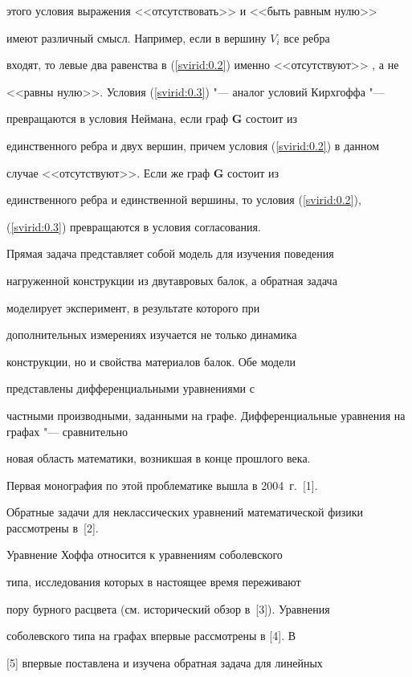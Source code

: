 этого условия вы\-ра\-же\-ния <<отсутствовать>>  и <<быть равным нулю>>

имеют различный смысл. Например, если в вершину $V_i$ все ребра

входят, то левые два равенства в (\ref{svirid:0.2}) именно <<отсутствуют>> , а не

<<равны нулю>>. Условия (\ref{svirid:0.3}) "--- аналог условий Кирхгоффа "---

превращаются в условия Неймана, если граф $\mathbf{G}$ состоит из

единственного ребра и двух вершин, причем условия (\ref{svirid:0.2}) в данном

случае <<отсутствуют>>. Если же граф $\mathbf{G}$ состоит из

единственного ребра и единственной вершины, то условия (\ref{svirid:0.2}),

(\ref{svirid:0.3}) превращаются в условия согласования.



Прямая задача представляет собой модель для изучения поведения

на\-гру\-жен\-ной конструкции из двутавровых балок, а обратная задача

мо\-де\-ли\-ру\-ет экс\-пе\-ри\-мент, в результате которого при

дополнительных из\-ме\-ре\-ни\-ях изучается не только динамика

конструкции, но и свойства ма\-те\-риа\-лов балок. Обе модели

представлены дифференциальными уравнениями с

част\-ны\-ми производными, за\-дан\-ны\-ми на графе. Дифференциальные урав\-не\-ния на графах "--- сравнительно

новая область математики, возникшая в конце прошлого века.

Первая мо\-но\-гра\-фия по этой проблематике вышла в 2004~г.~[1].

Обратные задачи для не\-клас\-си\-чес\-ких уравнений математической физики рассмотрены в~[2].

Уравнение Хоффа от\-но\-сит\-ся к уравнениям соболевского

типа, ис\-сле\-до\-ва\-ния которых в настоящее время пе\-ре\-жи\-ва\-ют

пору бурного рас\-цве\-та (см. исторический обзор в~[3]). Урав\-не\-ния

со\-бо\-лев\-ско\-го типа на графах впервые рассмотрены в [4]. В

[5] впервые поставлена и изучена обратная задача для линейных

